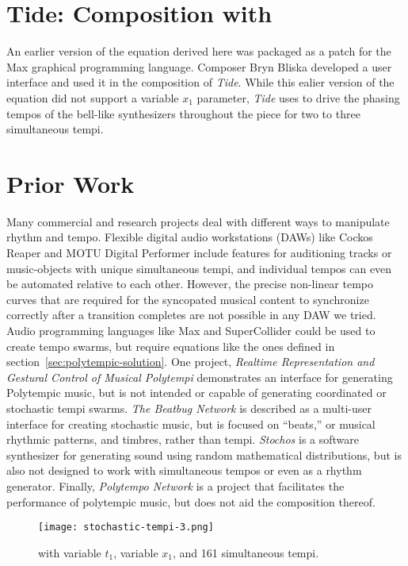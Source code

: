 \section{Tide: Composition with \polytempic}
\label{sec:composition}
An earlier version of the equation derived here was packaged as a
patch for the Max
graphical programming language. Composer Bryn Bliska developed a user
interface and used it in the composition of
\textit{Tide}.
While this ealier version of the equation did not support a variable
$x_1$ parameter, \textit{Tide} uses \polytempic to drive the phasing
tempos of the bell-like synthesizers throughout the piece for two to
three simultaneous tempi.

\section{Prior Work}
\label{sec:polytempic-prior-work}
Many commercial and research projects deal with different ways to
manipulate rhythm and tempo. Flexible digital audio workstations
(DAWs) like Cockos Reaper and
MOTU Digital
Performer
include features for auditioning tracks or music-objects with unique
simultaneous tempi, and individual tempos can even be automated
relative to each other. However, the precise non-linear tempo curves
that are required for the syncopated musical content to synchronize
correctly after a transition completes are not possible in any DAW we
tried. Audio programming languages like Max and
SuperCollider could be used
to create tempo swarms, but require equations like the ones defined in
section~\ref{sec:polytempic-solution}. One project, \textit{Realtime
  Representation and Gestural Control of Musical
  Polytempi}\cite{Nash2008} demonstrates an interface for generating
Polytempic music, but is not intended or capable of generating
coordinated or stochastic tempi swarms.  \textit{The Beatbug
  Network}\cite{Weinberg2002} is described as a multi-user interface
for creating stochastic music, but is focused on ``beats,'' or musical
rhythmic patterns, and timbres, rather than
tempi. \textit{Stochos}\cite{Bokesoy2003} is a software synthesizer
for generating sound using random mathematical distributions, but is
also not designed to work with simultaneous tempos or even as a rhythm
generator. Finally, \textit{Polytempo Network}\cite{Kocher2014} is a
project that facilitates the performance of polytempic music, but does
not aid the composition thereof.

\begin{figure*}[]
  \texttt{[image: stochastic-tempi-3.png]}
  \caption{\polytempic with variable $t_1$, variable $x_1$, and 161
    simultaneous tempi.}
  \label{fig:polytempic-transition-3}
\end{figure*}


